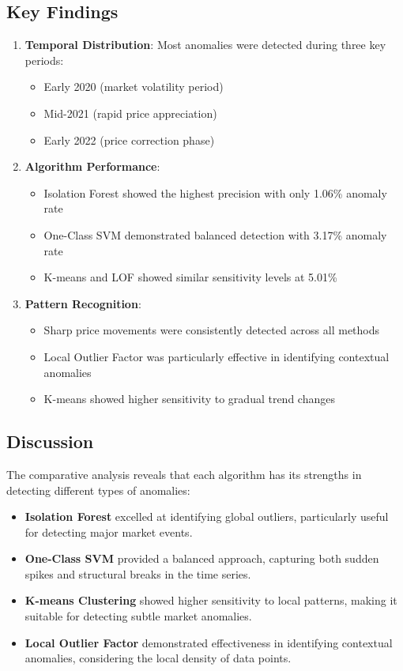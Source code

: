 \documentclass[conference]{IEEEtran}
\begin{document}
\subsection{Key Findings}
\begin{enumerate}
    \item \textbf{Temporal Distribution}: Most anomalies were detected during three key periods:
    \begin{itemize}
        \item Early 2020 (market volatility period)
        \item Mid-2021 (rapid price appreciation)
        \item Early 2022 (price correction phase)
    \end{itemize}
    \vspace{5}
    \item \textbf{Algorithm Performance}:
    \begin{itemize}
        \item Isolation Forest showed the highest precision with only 1.06\% anomaly rate
        \item One-Class SVM demonstrated balanced detection with 3.17\% anomaly rate
        \item K-means and LOF showed similar sensitivity levels at 5.01\%
    \end{itemize}
    
    \item \textbf{Pattern Recognition}:
    \begin{itemize}
        \item Sharp price movements were consistently detected across all methods
        \item Local Outlier Factor was particularly effective in identifying contextual anomalies
        \item K-means showed higher sensitivity to gradual trend changes
    \end{itemize}
\end{enumerate}

\subsection{Discussion}
The comparative analysis reveals that each algorithm has its strengths in detecting different types of anomalies:

\begin{itemize}
    \item \textbf{Isolation Forest} excelled at identifying global outliers, particularly useful for detecting major market events.
    \item \textbf{One-Class SVM} provided a balanced approach, capturing both sudden spikes and structural breaks in the time series.
    \item \textbf{K-means Clustering} showed higher sensitivity to local patterns, making it suitable for detecting subtle market anomalies.
    \item \textbf{Local Outlier Factor} demonstrated effectiveness in identifying contextual anomalies, considering the local density of data points.
\end{itemize}
\end{document}
